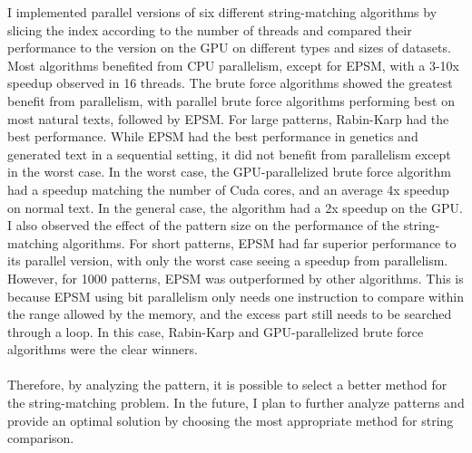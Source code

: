 \documentclass[11pt]{article}       %
\begin{document}
I implemented parallel versions of six different string-matching algorithms by slicing the index according to the number of threads and compared their performance to the version on the GPU on different types and sizes of datasets. Most algorithms benefited from CPU parallelism, except for EPSM, with a 3-10x speedup observed in 16 threads. The brute force algorithms showed the greatest benefit from parallelism, with parallel brute force algorithms performing best on most natural texts, followed by EPSM. For large patterns, Rabin-Karp had the best performance. While EPSM had the best performance in genetics and generated text in a sequential setting, it did not benefit from parallelism except in the worst case. In the worst case, the GPU-parallelized brute force algorithm had a speedup matching the number of Cuda cores, and an average 4x speedup on normal text. In the general case, the algorithm had a 2x speedup on the GPU. I also observed the effect of the pattern size on the performance of the string-matching algorithms. For short patterns, EPSM had far superior performance to its parallel version, with only the worst case seeing a speedup from parallelism. However, for 1000 patterns, EPSM was outperformed by other algorithms. This is because EPSM using bit parallelism only needs one instruction to compare within the range allowed by the memory, and the excess part still needs to be searched through a loop. In this case, Rabin-Karp and GPU-parallelized brute force algorithms were the clear winners. \\
\\Therefore, by analyzing the pattern, it is possible to select a better method for the string-matching problem. In the future, I plan to further analyze patterns and provide an optimal solution by choosing the most appropriate method for string comparison.
\end{document}
